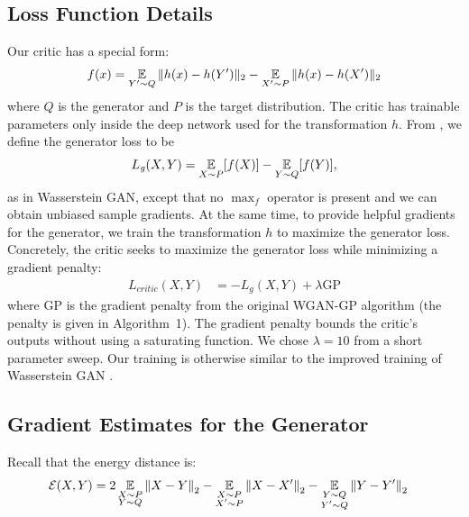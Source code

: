 \documentclass{article}
\begin{document}
\subsection{Loss Function Details}
Our critic has a special form:
\begin{align*}
  f(x) = \expect_{Y' \sim Q} \|h(x) - h(Y')\|_2 - \expect_{X' \sim P} \|h(x) - h(X')\|_2
\end{align*}
where $Q$ is the generator and $P$ is the target distribution.
The critic has trainable parameters only inside the deep network used for the transformation $h$.
From , we define the generator loss to be
\begin{align}
  L_\mathit{g}(X, Y) = \expect_{X \sim P} [f(X)] - \expect_{Y \sim Q} [f(Y)],
  \label{eqn:cramer_generator_loss}
\end{align}
as in Wasserstein GAN, except that no $\max_f$ operator is present and we can obtain unbiased sample gradients.
At the same time, to provide helpful gradients for the generator,
we train the transformation $h$ to maximize the generator loss.
Concretely, the critic seeks to maximize the generator loss while minimizing a gradient penalty:
\begin{align}
  L_\mathit{critic}(X, Y) &= -L_\mathit{g}(X, Y) + \lambda \mathrm{GP} \label{eqn:cramer_critic_loss}
\end{align}
where $\mathrm{GP}$ is the gradient penalty from the original WGAN-GP algorithm \citep{gulrajani2017improved} (the penalty is given in Algorithm~1). The gradient penalty bounds the critic's outputs without using a saturating function. We chose $\lambda = 10$ from a short parameter sweep. Our training is otherwise similar to the improved training of Wasserstein GAN \citep{gulrajani2017improved}.

\subsection{Gradient Estimates for the Generator}

Recall that the energy distance is:
\begin{align*}
  \cE(X, Y) &= 2 \expect_{\substack{X \sim P \\ Y \sim Q}} \norm{X - Y}_2
    - \expect_{\substack{X \sim P \\ X' \sim P}} \norm{X - X'}_2
    - \expect_{\substack{Y \sim Q \\ Y' \sim Q}} \norm{Y - Y'}_2
\end{align*}
\end{document}
